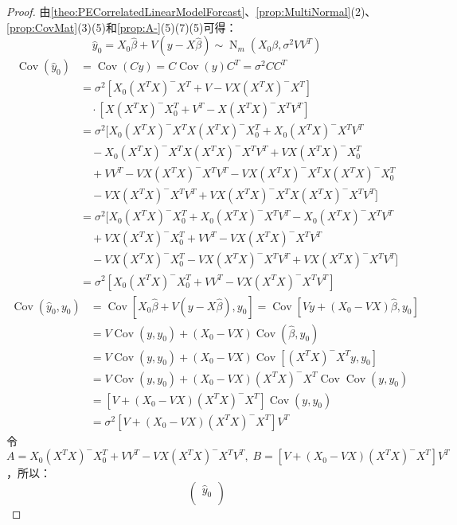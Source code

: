 \begin{proof}
	由\cref{theo:PECorrelatedLinearModelForcast}、\cref{prop:MultiNormal}(2)、\cref{prop:CovMat}(3)(5)和\cref{prop:A-}(5)(7)(5)可得：
	\begin{equation*}
		\hat{y}_0=X_0\hat{\beta}+V(y-X\hat{\beta})\sim\operatorname{N}_m(X_0\beta,\sigma^2VV^T)
	\end{equation*}
	\begin{align*}
		\operatorname{Cov}(\hat{y}_0)&=\operatorname{Cov}(Cy)=C\operatorname{Cov}(y)C^T=\sigma^2CC^T \\
		&=\sigma^2[X_0(X^TX)^-X^T+V-VX(X^TX)^-X^T] \\
		&\quad\cdot[X(X^TX)^-X_0^T+V^T-X(X^TX)^-X^TV^T] \\
		&=\sigma^2[X_0(X^TX)^-X^TX(X^TX)^-X_0^T+X_0(X^TX)^-X^TV^T \\
		&\quad-X_0(X^TX)^-X^TX(X^TX)^-X^TV^T+VX(X^TX)^-X_0^T \\
		&\quad+VV^T-VX(X^TX)^-X^TV^T-VX(X^TX)^-X^TX(X^TX)^-X_0^T \\
		&\quad-VX(X^TX)^-X^TV^T+VX(X^TX)^-X^TX(X^TX)^-X^TV^T] \\
		&=\sigma^2[X_0(X^TX)^-X_0^T+X_0(X^TX)^-X^TV^T-X_0(X^TX)^-X^TV^T \\
		&\quad+VX(X^TX)^-X_0^T+VV^T-VX(X^TX)^-X^TV^T \\
		&\quad-VX(X^TX)^-X_0^T-VX(X^TX)^-X^TV^T+VX(X^TX)^-X^TV^T] \\
		&=\sigma^2[X_0(X^TX)^-X_0^T+VV^T-VX(X^TX)^-X^TV^T]
	\end{align*}
	\begin{align*}
		\operatorname{Cov}(\hat{y}_0,y_0)
		&=\operatorname{Cov}[X_0\hat{\beta}+V(y-X\hat{\beta}),y_0]=\operatorname{Cov}[Vy+(X_0-VX)\hat{\beta},y_0] \\
		&=V\operatorname{Cov}(y,y_0)+(X_0-VX)\operatorname{Cov}(\hat{\beta},y_0) \\
		&=V\operatorname{Cov}(y,y_0)+(X_0-VX)\operatorname{Cov}[(X^TX)^-X^Ty,y_0] \\
		&=V\operatorname{Cov}(y,y_0)+(X_0-VX)(X^TX)^-X^T\operatorname{Cov}\operatorname{Cov}(y,y_0) \\
		&=[V+(X_0-VX)(X^TX)^-X^T]\operatorname{Cov}(y,y_0) \\
		&=\sigma^2[V+(X_0-VX)(X^TX)^-X^T]V^T
	\end{align*}
	令$A=X_0(X^TX)^-X_0^T+VV^T-VX(X^TX)^-X^TV^T,\;B=[V+(X_0-VX)(X^TX)^-X^T]V^T$，所以：
	\begin{equation*}
		\begin{pmatrix}
			\hat{y}_0 \\

\end{pmatrix}
\end{equation*}
\end{proof}
